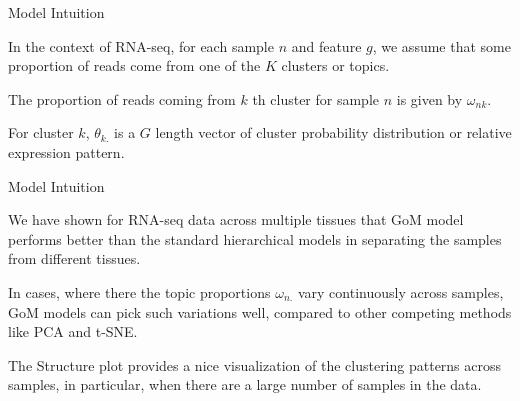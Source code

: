 \documentclass{beamer}\usepackage[]{graphicx}\usepackage[]{color}
\begin{document}
\begin{frame}[fragile]{Model Intuition\;\;}

In the context of RNA-seq, for each sample $n$ and feature $g$, we assume that some proportion of reads come from one of the $K$ clusters or topics. \pause \newline

The proportion of reads coming from $k$ th cluster for sample $n$ is given by $\omega_{nk}$. \pause \newline

For cluster $k$, $\theta_{k.}$ is a $G$ length vector of cluster probability distribution or relative expression pattern. \pause \newline

\end{frame}

\begin{frame}[fragile]{Model Intuition\;\;}

We have shown for RNA-seq data across multiple tissues that GoM model performs better than the standard hierarchical models in separating the samples from different tissues. \pause \newline

In cases, where there the topic proportions $\omega_{n.}$ vary continuously across samples, GoM models can pick such variations well, compared to other competing methods like PCA and t-SNE. \pause \newline

The Structure plot provides a nice visualization of the clustering patterns across samples, in particular, when there are a large number of samples in the data. \pause \newline

\end{frame}
\end{document}
